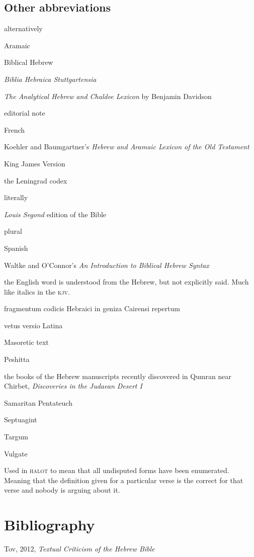 \subsection{Other abbreviations}
\begin{description}[labelsep=3em, font=\normalfont, itemsep=-0.25em]
    \item[\textsc{alt}] alternatively
    \item[Aram.] Aramaic
    \item[\textsc{bh}] Biblical Hebrew
    \item[\textsc{bhs}] \textit{Biblia Hebraica Stuttgartensia}
    \item[Davidson] \textit{The Analytical Hebrew and Chaldee Lexicon} by Benjamin Davidson
    \item[\textsc{ed}] editorial note
    \item[Fr.] French
    \item[\textsc{halot}] Koehler and Baumgartner's \textit{Hebrew and Aramaic Lexicon of the Old Testament}
    \item[\textsc{kjv}] King James Version
    \item[L] the Leningrad codex
    \item[\textsc{lit}] literally
    \item[\textsc{lsg}] \textit{Louis Segond} edition of the Bible
    \item[pl.] plural
    \item[Sp.] Spanish
    \item [W\&O] Waltke and O'Connor's \textit{An Introduction to Biblical Hebrew Syntax}
    \item[\textdegree\dots$\mathscr{U}$] the English word is understood from the Hebrew, but not explicitly said. Much like italics in the \textsc{kjv}.
    \item[\fragheb] fragmentum codicis Hebraici in geniza Cairensi repertum
    \item[\latina] vetus versio Latina
    \item[\masoretic] Masoretic text
    \item[\peshitta] Peshitta
    \item[\qumran] the books of the Hebrew manuscripts recently discovered in Qumran near Chirbet, \textit{Discoveries in the Judaean Desert I}
    \item[\sampen] Samaritan Pentateuch
    \item[\septuagint] Septuagint
    \item[\targum] Targum
    \item[\vulgate] Vulgate
    \item[$\dagger$] Used in \textsc{halot} to mean that all undisputed forms have been enumerated. Meaning that the definition given for a particular verse is the correct for that verse and nobody is arguing about it.
\end{description}

\section{Bibliography}
Tov, 2012, \textit{Textual Criticism of the Hebrew Bible}

